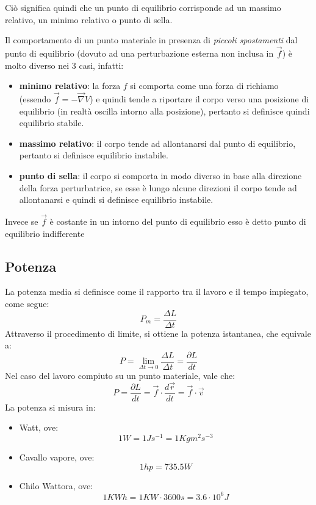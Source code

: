 \documentclass[11pt, a4paper, openright]{book}
\theoremstyle{plain}
\theoremstyle{definition}
\begin{document}
Ciò significa quindi che un punto di equilibrio corrisponde ad un massimo relativo, un minimo relativo o punto di sella.

Il comportamento di un punto materiale in presenza di \textit{piccoli spostamenti} dal punto di equilibrio (dovuto ad una perturbazione esterna non inclusa in $\vec{f}$) è molto diverso nei 3 casi, infatti:
\begin{itemize}
    \item \textbf{minimo relativo}: la forza $f$ si comporta come una forza di richiamo (essendo $\vec{f} = -\vec{\nabla}V$) e quindi tende a riportare il corpo verso una posizione di equilibrio (in realtà oscilla intorno alla posizione), pertanto si definisce quindi equilibrio stabile.

    \item \textbf{massimo relativo}: il corpo tende ad allontanarsi dal punto di equilibrio, pertanto si definisce equilibrio instabile.

    \item \textbf{punto di sella}: il corpo si comporta in modo diverso in base alla direzione della forza perturbatrice, se esse è lungo alcune direzioni il corpo tende ad allontanarsi e quindi si definisce equilibrio instabile.
\end{itemize}
Invece se $\vec{f}$ è costante in un intorno del punto di equilibrio esso è detto punto di equilibrio indifferente


\subsection{Potenza}
La potenza media si definisce come il rapporto tra il lavoro e il tempo impiegato, come segue:
\[P_m = \frac{\Delta L}{\Delta t}\]
Attraverso il procedimento di limite, si ottiene la potenza istantanea, che equivale a:
\[P = \lim_{\Delta t \to 0} \frac{\Delta L}{\Delta t} = \frac{\partial L}{dt}\]
Nel caso del lavoro compiuto su un punto materiale, vale che:
\[P = \frac{\partial L}{dt} = \vec{f} \cdot \frac{d\vec{r}}{dt} = \vec{f} \cdot \vec{v}\]
La potenza si misura in:
\begin{itemize}
    \item Watt, ove:
    \[1 W = 1Js^{-1} = 1Kgm^2s^{-3}\]

    \item Cavallo vapore, ove:
    \[1hp = 735.5 W\]

    \item Chilo Wattora, ove:
    \[1KWh= 1 KW \cdot 3600 s = 3.6 \cdot 10^{6}J\]
\end{itemize}
\end{document}
